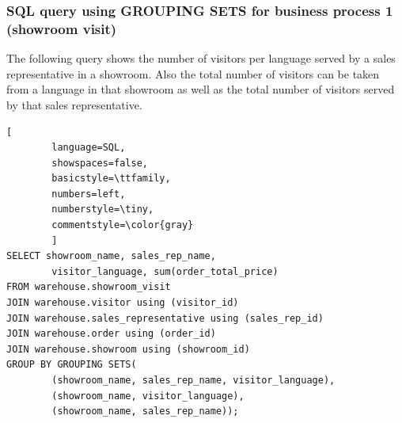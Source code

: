 \documentclass[letterpaper,12pt]{article}
\begin{document}
\subsubsection{SQL query using GROUPING SETS for business process 1 (showroom visit)}

The following query shows the number of visitors per language served by a sales representative in a showroom. Also the total number of visitors can be taken from a language in that showroom as well as the total number of visitors served by that sales representative.

\begin{lstlisting}[
        language=SQL,
        showspaces=false,
        basicstyle=\ttfamily,
        numbers=left,
        numberstyle=\tiny,
        commentstyle=\color{gray}
        ]
SELECT showroom_name, sales_rep_name, 
        visitor_language, sum(order_total_price)
FROM warehouse.showroom_visit
JOIN warehouse.visitor using (visitor_id)
JOIN warehouse.sales_representative using (sales_rep_id)
JOIN warehouse.order using (order_id)
JOIN warehouse.showroom using (showroom_id)
GROUP BY GROUPING SETS(
        (showroom_name, sales_rep_name, visitor_language),
        (showroom_name, visitor_language),
        (showroom_name, sales_rep_name));
\end{lstlisting} 
\end{document}
